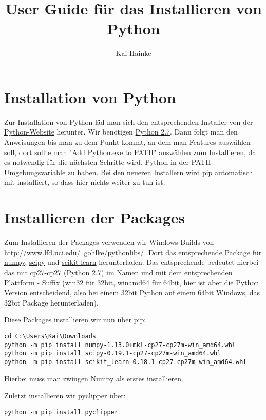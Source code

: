\documentclass[a4paper, openany, oneside]{memoir}
\title{User Guide für das Installieren von Python}
\author{Kai Hainke}
\begin{document}
\maketitle



\chapter{Installation von Python}
Zur Installation von Python läd man sich den entsprechenden Installer von der \href{https://www.python.org/}{Python-Website} herunter. Wir benötigen \href{https://www.python.org/downloads/release/python-2713/}{Python 2.7}. Dann folgt man den Anweisungen bis man zu dem Punkt kommt, an dem man Features auswählen soll, dort sollte man "Add Python.exe to PATH" auswählen zum Installieren, da es notwendig für die nächsten Schritte wird, Python in der PATH Umgebungsvariable zu haben. Bei den neueren Installern wird pip automatisch mit installiert, so dass hier nichts weiter zu tun ist.   

\chapter{Installieren der Packages}
Zum Installieren der Packages verwenden wir Windows Builds von \href{http://www.lfd.uci.edu/~gohlke/pythonlibs/}{http://www.lfd.uci.edu/~gohlke/pythonlibs/}. Dort das entsprechende Package für \href{http://www.lfd.uci.edu/~gohlke/pythonlibs/#numpy}{numpy}, \href{http://www.lfd.uci.edu/~gohlke/pythonlibs/#scipy}{scipy} und \href{http://www.lfd.uci.edu/~gohlke/pythonlibs/#scikit-learn}{scikit-learn} herunterladen. Das entsprechende bedeutet hierbei das mit cp27-cp27 (Python 2.7) im Namen und mit dem entsprechenden Plattform - Suffix (win32 für 32bit, win\textunderscore amd64 für 64bit, hier ist aber die Python Version entscheidend, also bei einem 32bit Python auf einem 64bit Windows, das 32bit Package herunterladen).

Diese Packages installieren wir nun über pip: 

\begin{minipage}[c, language=batch]{\textwidth}
\begin{lstlisting}
cd C:\Users\Kai\Downloads
python -m pip install numpy-1.13.0+mkl-cp27-cp27m-win_amd64.whl
python -m pip install scipy-0.19.1-cp27-cp27m-win_amd64.whl
python -m pip install scikit_learn-0.18.1-cp27-cp27m-win_amd64.whl
\end{lstlisting}
\end{minipage}

Hierbei muss man zwingen Numpy als erstes installieren.

Zuletzt installieren wir pyclipper über:

\begin{minipage}[c, language=batch]{\textwidth}
\begin{lstlisting}
python -m pip install pyclipper
\end{lstlisting}
\end{minipage}
\end{document}
